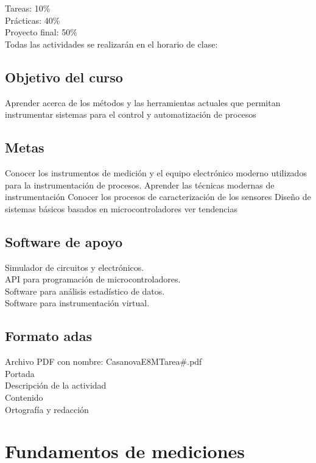 \documentclass[11pt]{report}
\theoremstyle{plain}
\theoremstyle{definition}
\begin{document}
Tareas: 10\% \\
Prácticas: 40\% \\
Proyecto final: 50\% \\

Todas las actividades se realizarán en el horario de clase:

\section{Objetivo del curso}
Aprender acerca de los métodos y las herramientas actuales que permitan instrumentar sistemas para el control y automatización de procesos

\section{Metas}
Conocer los instrumentos de medición y el equipo electrónico moderno utilizados para la instrumentación de procesos.
Aprender las técnicas modernas de instrumentación
Conocer los procesos de caracterización de los sensores
Diseño de sistemas básicos basados en microcontroladores
ver tendencias 


\section{Software de apoyo}
Simulador de circuitos y electrónicos.\\
API para programación de microcontroladores.\\
Software para análisis estadístico de datos.\\
Software para instrumentación virtual.


\section{Formato adas}
Archivo PDF con nombre: CasanovaE8MTarea\#.pdf \\
Portada \\
Descripción de la actividad \\
Contenido \\
Ortografía y redacción\\


\chapter{Fundamentos de mediciones}
\end{document}
